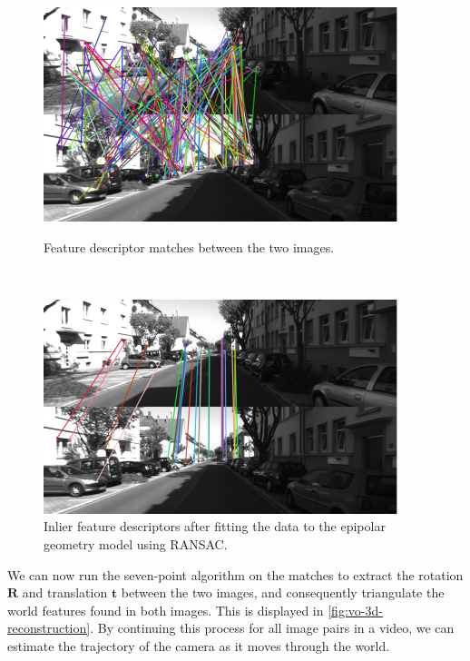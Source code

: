 \begin{figure}[h]
    \centering
    \captionsetup{format=plain}
    \begin{minipage}[t]{0.475\textwidth}
        \centering
        \includegraphics[width=\textwidth]{figures/vo_matches.pdf}
        \caption{Feature descriptor matches between the two images.}
        \label{fig:vo-matches}
    \end{minipage}\hfill%
    ~
    \begin{minipage}[t]{0.475\textwidth}
        \centering
        \includegraphics[width=\textwidth]{figures/vo_matches_ransac.pdf}
        \caption{Inlier feature descriptors after fitting the data to the epipolar geometry model using RANSAC.}
        \label{fig:vo-matches-ransac}
    \end{minipage}%
\end{figure}

We can now run the seven-point algorithm on the matches to extract the rotation $\mathbf{R}$ and translation $\mathbf{t}$ between the two images, and consequently triangulate the world features found in both images. This is displayed in \autoref{fig:vo-3d-reconstruction}. By continuing this process for all image pairs in a video, we can estimate the trajectory of the camera as it moves through the world.

